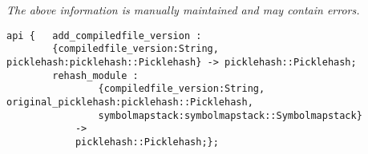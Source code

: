 \label{pkg:rehash\_module}

{\tiny \it The above information is manually maintained and may contain errors.}
\begin{verbatim}
api {   add_compiledfile_version :
        {compiledfile_version:String, picklehash:picklehash::Picklehash} -> picklehash::Picklehash;
        rehash_module :
                {compiledfile_version:String, original_picklehash:picklehash::Picklehash,
                symbolmapstack:symbolmapstack::Symbolmapstack}
            ->
            picklehash::Picklehash;};
\end{verbatim}
